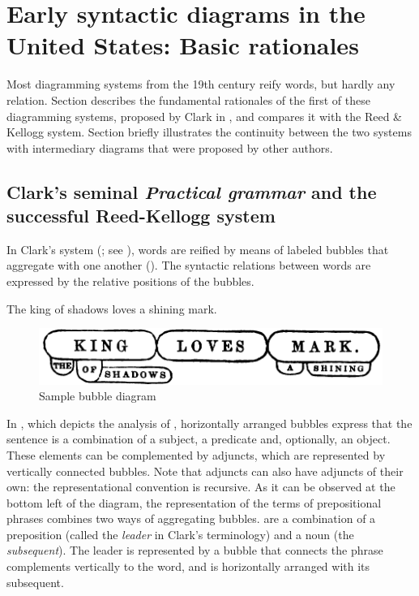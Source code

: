 \documentclass[english,output=paper,colorlinks,citecolor=brown]{../langscibook}
\begin{document}
\section{Early syntactic diagrams in the United States: Basic rationales}\label{sec:4:3}

Most dia\-gramming systems from the 19th century reify words, but hardly any relation. Section  describes the fundamental rationales of the first of these dia\-gramming systems, proposed by Clark in \citeyear{Clark1847}, and compares it with the Reed \& Kellogg system. Section  briefly illustrates the continuity between the two systems with intermediary diagrams that were proposed by other authors.

\subsection{Clark’s seminal \textit{Practical grammar} and the successful Reed-Kellogg system}\label{sec:4:3.1}

In Clark’s system (\citeyear{Clark1847}; see \citealt{Mazziotta2016}), words are reified by means of labeled bubbles that aggregate with one another (). The syntactic relations between words are expressed by the relative positions of the bubbles. 

\ea \label{ex:4:2} The king of shadows loves a shining mark.
\z
  
\begin{figure}[b]
    \includegraphics[width=.75\textwidth]{figures/04/Clark.png}
    \caption{Sample bubble diagram \citep[23]{Clark1847}\label{fig:4:3}}
\end{figure}

\hspace*{-1.5mm}In , which depicts the analysis of , horizontally arranged bubbles express that the sentence is a combination of a  subject, a predicate and, optionally, an object. These elements can be complemented by adjuncts, which are represented by vertically connected bubbles. Note that adjuncts can also have adjuncts of their own: the representational convention is recursive. As it can be observed at the bottom left of the diagram, the representation of the terms of prepositional phrases combines two ways of aggregating bubbles.  are a combination of a preposition (called the \textit{leader} in Clark’s terminology) and a noun (the \textit{subsequent}). The leader is represented by a bubble that connects the phrase complements vertically to the word, and is horizontally arranged with its subsequent.
\end{document}
